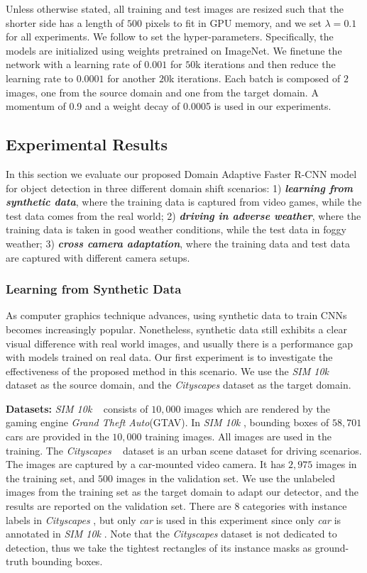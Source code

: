 \documentclass[10pt,twocolumn,letterpaper]{article}
\def\dim{\textit{SIM 10k} }
\def\cs{\textit{Cityscapes} }
\begin{document}
Unless otherwise stated, all training and test images are resized such that the shorter side has a length of $500$ pixels to fit in GPU memory, and we set $\lambda=0.1$ for all experiments. We follow \cite{ren2015faster} to set the hyper-parameters. Specifically, the models are initialized using weights pretrained on ImageNet. We finetune the network with a learning rate of $0.001$ for $50$k iterations and then reduce the learning rate to $0.0001$ for another $20$k iterations. Each batch is composed of $2$ images, one from the source domain and one from the target domain. A momentum of 0.9 and a weight decay of 0.0005 is used in our experiments. 
\subsection{Experimental Results}
In this section we evaluate our proposed Domain Adaptive Faster R-CNN model for object detection in three different domain shift scenarios: 1) \textit{\textbf{learning from synthetic data}}, where the training data is captured from video games, while the test data comes from the real world; 2) \textit{\textbf{driving in adverse weather}}, where the training data is taken in good weather conditions, while the test data in foggy weather; 3) \textit{\textbf{cross camera adaptation}}, where the training data and test data are captured with different camera setups. 
\label{sec:experimental_results}
\subsubsection{Learning from Synthetic Data}
As computer graphics technique advances, using synthetic data to train CNNs becomes increasingly popular. Nonetheless, synthetic data still exhibits a clear visual difference with real world images, and usually there is a performance gap with models trained on real data. Our first experiment is to investigate the effectiveness of the proposed method in this scenario. We use the \dim~\cite{johnson2017driving} dataset as the source domain, and the \cs dataset as the target domain. 

\textbf{Datasets: } \dim~\cite{johnson2017driving} consists of $10,000$ \mbox{images} which are rendered by the gaming engine \textit{Grand Theft Auto}(GTAV). In \dim, bounding boxes of $58,701$ cars are provided in the $10,000$ training images. All images are used in the training. The \cs~\cite{cordts2016cityscapes} dataset is an urban scene dataset for driving scenarios. The images are captured by a car-mounted video camera. It has $2,975$ images in the training set, and $500$ images in the validation set. We use the unlabeled images from the training set as the target domain to adapt our detector, and the results are reported on the validation set. There are $8$ categories with instance labels in \cs, but only \textit{car} is used in this experiment since only \textit{car} is annotated in \dim. Note that the \cs dataset is not dedicated to detection, thus we take the tightest rectangles of its instance masks as ground-truth bounding boxes. 
\end{document}
